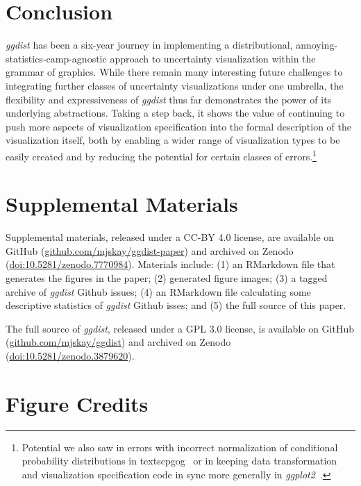 \documentclass[journal]{vgtc}                     %
\begin{document}
\section{Conclusion}

\textit{ggdist} has been a six-year journey in implementing a distributional, annoying-statistics-camp-agnostic approach to uncertainty visualization within the grammar of graphics. While there remain many interesting future challenges to integrating further classes of uncertainty visualizations under one umbrella, the flexibility and expressiveness of \textit{ggdist} thus far demonstrates the power of its underlying abstractions. Taking a step back, it shows the value of continuing to push more aspects of visualization specification into the formal description of the visualization itself, both by enabling a wider range of visualization types to be easily created and by reducing the potential for certain classes of errors.\footnote{Potential we also saw in errors with incorrect normalization of conditional probability distributions in textsc{pgog}~\cite{pu2020probabilistic} or in keeping data transformation and visualization specification code in sync more generally in \textit{ggplot2}~\cite{pu2023inpractice}.} 

\section*{Supplemental Materials}
\label{sec:supplemental_materials}

Supplemental materials, released under a CC-BY 4.0 license, are available on GitHub (\href{https://github.com/mjskay/ggdist-paper}{github.com/mjskay/ggdist-paper}) and archived on Zenodo (\href{https://doi.org/10.5281/zenodo.7770984}{doi:10.5281/zenodo.7770984}).
Materials include: (1) an RMarkdown file that generates the figures in the paper; (2) generated figure images; (3) a tagged archive of \textit{ggdist} Github issues; (4) an RMarkdown file calculating some descriptive statistics of \textit{ggdist} Github isses; and (5) the full source of this paper.

The full source of \textit{ggdist}, released under a GPL 3.0 license, is available on GitHub (\href{https://github.com/mjskay/ggdist}{github.com/mjskay/ggdist}) and archived on Zenodo (\href{https://doi.org/10.5281/zenodo.3879620}{doi:10.5281/zenodo.3879620}).

\section*{Figure Credits}
\label{sec:figure_credits}
\end{document}
